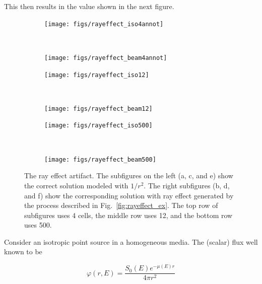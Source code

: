 This then results in the value shown in the next figure.

\begin{figure}
    \centering
    \begin{subfigure}[b]{0.45\textwidth}
        \texttt{[image: figs/rayeffect\_iso4annot]}
        \caption{}
        \label{fig:rayeffect_iso4annot}
    \end{subfigure}
    ~ 
    \begin{subfigure}[b]{0.45\textwidth}
        \texttt{[image: figs/rayeffect\_beam4annot]}
        \caption{}
        \label{fig:rayeffect_beam4annot}
    \end{subfigure}
    
    \begin{subfigure}[b]{0.45\textwidth}
        \texttt{[image: figs/rayeffect\_iso12]}
        \caption{}
        \label{fig:rayeffect_iso12}
    \end{subfigure}
    ~
    \begin{subfigure}[b]{0.45\textwidth}
        \texttt{[image: figs/rayeffect\_beam12]}
        \caption{}
        \label{fig:rayeffect_beam12}
    \end{subfigure}
    
    \begin{subfigure}[b]{0.45\textwidth}
        \texttt{[image: figs/rayeffect\_iso500]}
        \caption{}
        \label{fig:rayeffect_iso500}
    \end{subfigure}
    ~
    \begin{subfigure}[b]{0.45\textwidth}
        \texttt{[image: figs/rayeffect\_beam500]}
        \caption{}
        \label{fig:rayeffect_beam500}
    \end{subfigure}
    \caption{The ray effect artifact. The subfigures on the left (a, c, and e) show the correct solution modeled with $1/r^2$. The right subfigures (b, d, and f) show the corresponding solution with ray effect generated by the process described in Fig.~\ref{fig:rayeffect_ex}. The top row of subfigures uses 4 cells, the middle row uses 12, and the bottom row uses 500.}\label{fig:rayeffect_comp}
\end{figure}

Consider an isotropic point source in a homogeneous media. The (scalar) flux well known to be

\begin{equation}
\varphi(r, E) = \frac{S_0(E) e^{-\mu(E) r}}{4 \pi r^2}
\end{equation}

